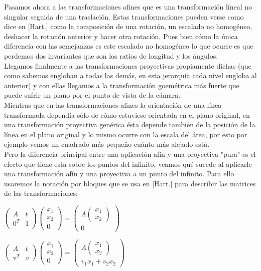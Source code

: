\documentclass[10pt,a4paper]{article}
\begin{document}
Pasamos ahora a las transformaciones afines que es una transformación líneal no singular seguida de una traslación. Estas transformaciones pueden verse como dice en [Hart.] como la composición de una rotación, un escalado no homogéneo, deshacer la rotación anterior y hacer otra rotación. Pues bien cómo la única diferencia con las semejanzas es este escalado no homogéneo lo que ocurre es que perdemos dos invariantes que son los ratios de longitud y los ángulos.\\

Llegamos finalmente a las transformaciones proyectivas propiamente dichas (que como sabemos engloban a todas las demás, en esta jerarquía cada nivel engloba al anterior) y con ellas llegamos a la transformación goemétrica más fuerte que puede sufrir un plano por el punto de vista de la cámara.\\

Mientras que en las transformaciones afines la orientación de una línea transformada dependía sólo de cómo estuviese orientada en el plano original, en una transformación proyectiva genérica ésta depende también de la posición de la línea en el plano original y lo mismo ocurre con la escala del área, por esto por ejemplo vemos un cuadrado más pequeño cuánto más alejado está.\\

Pero la diferencia principal entre una aplicación afín y una proyectiva "pura" es el efecto que tiene esta sobre los puntos del infinito, veamos qué sucede al aplicarle una transformación afín y una proyectiva a un punto del infinito. Para ello usaremos la notación por bloques que se usa en [Hart.] para describir las matrices de las transformaciones:\\
\begin{center}
$\begin{pmatrix}
A&t\\
0^T&1
\end{pmatrix}
\begin{pmatrix}
x_1\\x_2\\0
\end{pmatrix}
=
\begin{pmatrix}
A\begin{pmatrix} x_1\\x_2\end{pmatrix}\\
0
\end{pmatrix}
$

$\begin{pmatrix}
A&t\\
\mathrm{v}^T&v
\end{pmatrix}
\begin{pmatrix}
x_1\\x_2\\0
\end{pmatrix}
=
\begin{pmatrix}
A\begin{pmatrix} x_1\\x_2\end{pmatrix}\\
v_1x_1+v_2x_2
\end{pmatrix}
$
\end{center}
\end{document}
